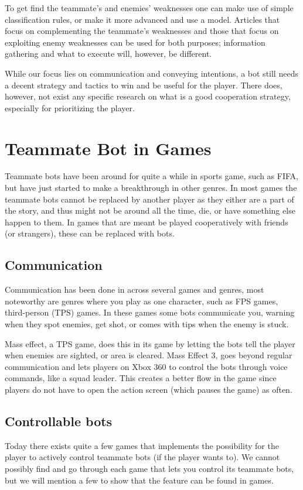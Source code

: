 To get find the teammate’s and enemies’ weaknesses one can make use of simple classification rules, or make it more advanced and use a model. Articles that focus on complementing the teammate’s weaknesses\cite{jansen07, pucheng11,houlette03} and those that focus on exploiting enemy weaknesses\cite{kabanza10, schadd07, synnaeve11} can be used for both purposes; information gathering and what to execute will, however, be different.

While our focus lies on communication and conveying intentions, a bot still needs a decent strategy and tactics to win and be useful for the player. There does, however, not exist any specific research on what is a good cooperation strategy, especially for prioritizing the player.

\section{Teammate Bot in Games}
Teammate bots have been around for quite a while in sports game, such as FIFA\cite{fifa}, but have just started to make a breakthrough in other genres. In most games\cite{callofduty, brotherinarms, rainbow6} the teammate bots cannot be replaced by another player as they either are a part of the story, and thus might not be around all the time, die, or have something else happen to them. In games that are meant be played cooperatively with friends (or strangers), these can be replaced with bots\cite{residentevil5, lostplanet2}.


\subsection{Communication}
\label{sec:game_communication}
Communication has been done in across several games and genres, most noteworthy are genres where you play as one character, such as FPS games, third-person (TPS) games. In these games some bots communicate you, warning when they spot enemies, get shot, or comes with tips when the enemy is stuck.

Mass effect, a TPS game, does this in its game by letting the bots tell the player when enemies are sighted, or area is cleared. Mass Effect 3, goes beyond regular communication and lets players on Xbox 360 to control the bots through voice commands, like a squad leader. This creates a better flow in the game since players do not have to open the action screen (which pauses the game) as often.


\subsection{Controllable bots}
\label{sec:games_controllable}
Today there exists quite a few games that implements the possibility for the player to actively control teammate bots (if the player wants to). We cannot possibly find and go through each game that lets you control its teammate bots, but we will mention a few to show that the feature can be found in games.

